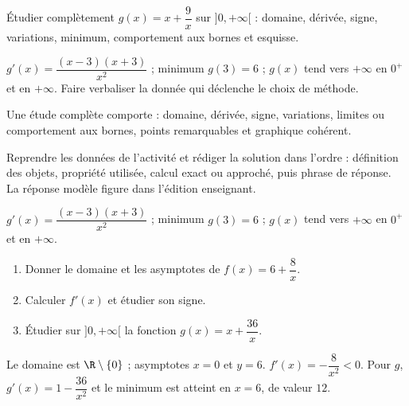 \begin{activity}
Étudier complètement $g(x)=x+\dfrac9x$ sur $]0,+\infty[$ : domaine, dérivée, signe, variations, minimum, comportement aux bornes et esquisse.
\begin{center}\end{center}
\end{activity}
\begin{solution}$g'(x)=\dfrac{(x-3)(x+3)}{x^2}$ ; minimum $g(3)=6$ ; $g(x)$ tend vers $+\infty$ en $0^+$ et en $+\infty$. Faire verbaliser la donnée qui déclenche le choix de méthode.\end{solution}

\begin{summary}Une étude complète comporte : domaine, dérivée, signe, variations, limites ou comportement aux bornes, points remarquables et graphique cohérent.\end{summary}

\begin{example}
Reprendre les données de l'activité et rédiger la solution dans l'ordre : définition des objets, propriété utilisée, calcul exact ou approché, puis phrase de réponse. La réponse modèle figure dans l'édition enseignant.
\end{example}
\begin{solution}$g'(x)=\dfrac{(x-3)(x+3)}{x^2}$ ; minimum $g(3)=6$ ; $g(x)$ tend vers $+\infty$ en $0^+$ et en $+\infty$.\end{solution}

\begin{exercise}[essentiel]
\begin{enumerate}\item Donner le domaine et les asymptotes de $f(x)=6+\dfrac{8}x$.\item Calculer $f'(x)$ et étudier son signe.\item Étudier sur $]0,+\infty[$ la fonction $g(x)=x+\dfrac{36}x$.\end{enumerate}
\end{exercise}
\begin{solution}Le domaine est $\R\setminus\{0\}$ ; asymptotes $x=0$ et $y=6$. $f'(x)=-\dfrac{8}{x^2}<0$. Pour $g$, $g'(x)=1-\dfrac{36}{x^2}$ et le minimum est atteint en $x=6$, de valeur $12$.\end{solution}


